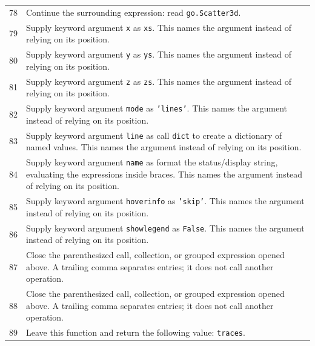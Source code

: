 \documentclass[11pt,a4paper]{book}
\begin{document}
\begin{longtable}{r p{}}
78 & Continue the surrounding expression: read \texttt{go.Scatter3d}. \\

79 & Supply keyword argument \texttt{x} as \texttt{xs}. This names the argument instead of relying on its position. \\

80 & Supply keyword argument \texttt{y} as \texttt{ys}. This names the argument instead of relying on its position. \\

81 & Supply keyword argument \texttt{z} as \texttt{zs}. This names the argument instead of relying on its position. \\

82 & Supply keyword argument \texttt{mode} as \texttt{'lines'}. This names the argument instead of relying on its position. \\

83 & Supply keyword argument \texttt{line} as call \texttt{dict} to create a dictionary of named values. This names the argument instead of relying on its position. \\

84 & Supply keyword argument \texttt{name} as format the status/display string, evaluating the expressions inside braces. This names the argument instead of relying on its position. \\

85 & Supply keyword argument \texttt{hoverinfo} as \texttt{'skip'}. This names the argument instead of relying on its position. \\

86 & Supply keyword argument \texttt{showlegend} as \texttt{False}. This names the argument instead of relying on its position. \\

87 & Close the parenthesized call, collection, or grouped expression opened above. A trailing comma separates entries; it does not call another operation. \\

88 & Close the parenthesized call, collection, or grouped expression opened above. A trailing comma separates entries; it does not call another operation. \\

89 & Leave this function and return the following value: \texttt{traces}. \\

\end{longtable}
\end{document}
